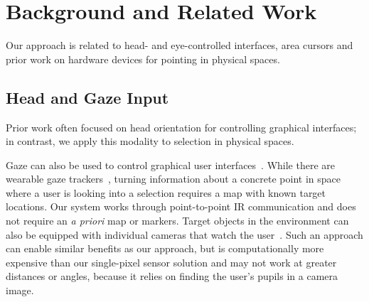 \section{Background and Related Work}
Our approach is related to head- and eye-controlled interfaces, area cursors and prior work on hardware devices for pointing in physical spaces.

\vfill
{}
\subsection{Head and Gaze Input}
%
%
Prior work often focused on head orientation for controlling graphical interfaces; in contrast, we apply this modality to selection in physical spaces.

Gaze can also be used to control graphical user interfaces~\cite{kumar2007eyepoint}. While there are wearable gaze trackers~\cite{bulling2009wearable}, turning information about a concrete point in space where a user is looking into a selection requires a map with known target locations.
Our system works through point-to-point IR communication and does not require an {\em a priori} map or markers. Target objects in the environment can also be equipped with individual cameras that watch the user~\cite{smith2013gaze,vertegaal2005media}. Such an approach can enable similar benefits as our approach, but is computationally more expensive than our single-pixel sensor solution and may not work at greater distances or angles, because it relies on finding the user's pupils in a camera image.


